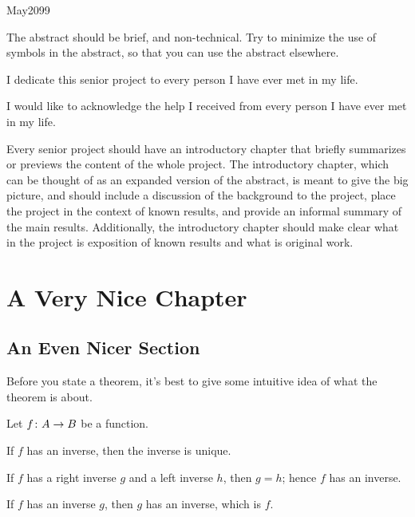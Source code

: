 \documentclass[11pt, twoside, reqno]{book}
\begin{document}
    {May}{2099}

\abstr

The abstract should be brief, and non-technical.  Try to minimize the use of symbols in the abstract, so that you can use the abstract elsewhere.

\tableofcontents

\dedic

I dedicate this senior project to every person I have ever met in my life.

\acknowl

I would like to acknowledge the help I received from every person I have ever met in my life.

\startmain


\intro

Every senior project should have an introductory chapter that briefly summarizes or previews the content of the whole project.  The introductory chapter, which can be thought of as an expanded version of the abstract, is meant to give the big picture, and should include a discussion of the background to the project, place the project in the context of known results, and provide an informal summary of the main results.  Additionally, the introductory chapter should make clear what in the project is exposition of known results and what is original work.


\chapter{A Very Nice Chapter}
\label{chapA}

\section{An Even Nicer Section}
\label{secA1}

Before you state a theorem, it's best to give some intuitive idea of what the theorem is about.

\thm\label{thmAA} 
Let ${f} \colon {A} \to {B}$ be a function.
%
\enum 
\item\label{thmAA1}
If $f$ has an inverse, then the inverse is unique.
%
\item\label{thmAA2}
If $f$ has a right inverse $g$ and a left inverse $h$, then $g = h$; hence $f$ has an inverse.
%
\item\label{thmAA3}
If $f$ has an inverse $g$, then $g$ has an inverse, which is $f$.
\eenum
\ethm
 
\end{document}
